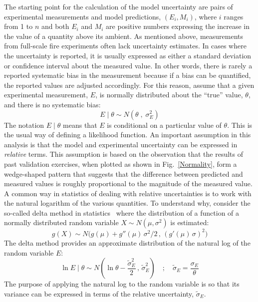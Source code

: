 \documentclass[fleqn,b5paper]{article}
\begin{document}
The starting point for the calculation of the model uncertainty are pairs of experimental measurements and model predictions, $(E_i,M_i)$, where $i$ ranges from 1 to $n$ and both $E_i$ and $M_i$ are positive numbers expressing the increase in the value of a quantity above its ambient. As mentioned above, measurements from full-scale fire experiments often lack uncertainty estimates. In cases where the uncertainty is reported, it is usually expressed as either a standard deviation or confidence interval about the measured value. In other words, there is rarely a reported systematic bias in the measurement because if a bias can be quantified, the reported values are adjusted accordingly. For this reason, assume that a given experimental measurement, $E$, is normally distributed about the ``true'' value, $\theta$, and there is no systematic bias:
\begin{equation}
   E \; | \; \theta \sim N(\theta \; , \; \sigma_E^2) \label{expunc}
\end{equation}
The notation $E \; | \; \theta$ means that $E$ is conditional on a particular value of $\theta$. This is the usual way of defining a likelihood function. An important assumption in this analysis is that the model and experimental uncertainty can be expressed in {\em relative} terms. This assumption is based on the observation that the results of past validation exercises, when plotted as shown in Fig.~\ref{Normality}, form a wedge-shaped pattern that suggests that the difference between predicted and measured values is roughly proportional to the magnitude of the measured value. A common way in statistics of dealing with relative uncertainties is to work with the natural logarithm of the various quantities. To understand why, consider the so-called delta method in statistics~\cite{Oehlert:1992} where the distribution of a function of a normally distributed random variable $X \sim N(\mu,\sigma^2)$ is estimated:
\begin{equation}
   g(X) \sim N \big( g(\mu) + g''(\mu) \, \sigma^2/2 \, , \, (g'(\mu) \, \sigma)^2 \big) 
\end{equation}
The delta method provides an approximate distribution of the natural log of the random variable $E$:
\begin{equation}
   \ln E \; | \; \theta \sim N \left( \ln \theta - \frac{\widetilde{\sigma}_E^2}{2} \, , \,\widetilde{\sigma}_E^2 \right)  \quad ; \quad \widetilde{\sigma}_E=\frac{\sigma_E}{\theta} \label{eeq}
\end{equation}
The purpose of applying the natural log to the random variable is so that its variance can be expressed in terms of the relative uncertainty, $\widetilde{\sigma}_E$.
\end{document}
